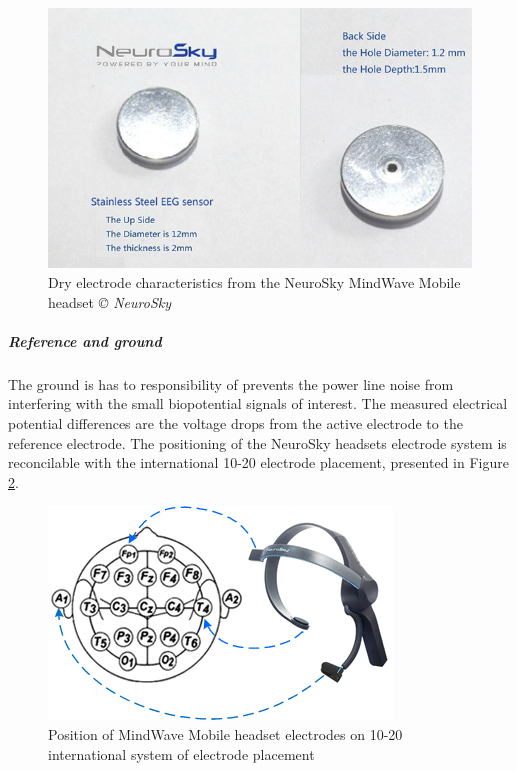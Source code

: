 \documentclass[letterpaper,10pt]{article}
\begin{document}
\begin{figure}[h]
\centering
\includegraphics[scale=2]{neuroskjy.png}
\caption[Dry electrode characteristics from the NeuroSky MindWave Mobile headset]{Dry electrode characteristics from the NeuroSky MindWave Mobile headset \textit{© NeuroSky}}
\label{fig:electrode}
\end{figure}

\subparagraph{Reference and ground}
The ground is has to responsibility of prevents the power line noise from interfering with the small biopotential signals of interest. The measured electrical potential differences are the voltage drops from the active electrode to the reference electrode. \cite{biopac}
The positioning of the NeuroSky headsets electrode system is reconcilable with the international 10-20 electrode placement, presented in Figure \ref{fig:electrodeplacement}.

\begin{figure}[h]
\centering
\includegraphics[scale=0.6]{positioning.png}
\caption[Position of MindWave Mobile headset electrodes on 10-20 international system of electrode placement]{Position of MindWave Mobile headset electrodes on 10-20 international system of electrode placement \cite{matiko_beeby_tudor_2013}}
\label{fig:electrodeplacement}
\end{figure}
\end{document}
